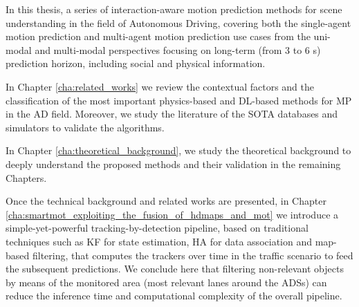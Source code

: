 
In this thesis, a series of interaction-aware motion prediction methods for scene understanding in the field of Autonomous Driving, covering both the single-agent motion prediction and multi-agent motion prediction use cases from the uni-modal and multi-modal perspectives focusing on long-term (from 3 to 6 s) prediction horizon, including social and physical information.


In Chapter \ref{cha:related_works} we review the contextual factors and the classification of the most important physics-based and \acf{DL}-based methods for \acf{MP} in the \acf{AD} field. Moreover, we study the literature of the \acf{SOTA} databases and simulators to validate the algorithms.

In Chapter \ref{cha:theoretical_background}, we study the theoretical background to deeply understand the proposed methods and their validation in the remaining Chapters.

Once the technical background and related works are presented, in Chapter \ref{cha:smartmot_exploiting_the_fusion_of_hdmaps_and_mot} we introduce a simple-yet-powerful tracking-by-detection pipeline, based on traditional techniques such as \acf{KF} for state estimation, \acf{HA} for data association and map-based filtering, that computes the trackers over time in the traffic scenario to feed the subsequent predictions. We conclude here that filtering non-relevant objects by means of the monitored area (most relevant lanes around the \acfp{ADS}) can reduce the inference time and computational complexity of the overall pipeline.

